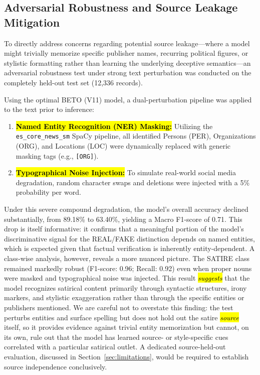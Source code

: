 \documentclass[informatics,article,accept,pdftex,moreauthors]{Definitions/mdpi}
\begin{document}
\subsection{Adversarial Robustness and Source Leakage Mitigation}
To directly address concerns regarding potential source leakage—where a model might trivially memorize specific publisher names, recurring political figures, or stylistic formatting rather than learning the underlying deceptive semantics—an adversarial robustness test under strong text perturbation was conducted on the completely held-out test set (12,336 records).

Using the optimal BETO (V11) model, a dual-perturbation pipeline was applied to the text prior to inference:
\begin{enumerate}
    \item \textbf{\hl{Named Entity Recognition (NER) Masking:}} Utilizing the \texttt{es\_core\_news\_sm} SpaCy pipeline, all identified Persons (PER), Organizations (ORG), and Locations (LOC) were dynamically replaced with generic masking tags (e.g., \texttt{[ORG]}).
    \item \textbf{\hl{Typographical Noise Injection:}} To simulate real-world social media degradation, random character swaps and deletions were injected with a 5\% probability per word.
\end{enumerate}

Under this severe compound degradation, the model's overall accuracy declined substantially, from 89.18\% to 63.40\%, yielding a Macro F1-score of 0.71. This drop is itself informative: it confirms that a meaningful portion of the model's discriminative signal for the REAL/FAKE distinction depends on named entities, which is expected given that factual verification is inherently entity-dependent. A class-wise analysis, however, reveals a more nuanced picture. The SATIRE class remained markedly robust (F1-score: 0.96; Recall: 0.92) even when proper nouns were masked and typographical noise was injected. This result \emph{\hl{suggests}} that the model recognizes satirical content primarily through syntactic structures, irony markers, and stylistic exaggeration rather than through the specific entities or publishers mentioned. We are careful not to overstate this finding: the test perturbs entities and surface spelling but does not hold out the satire \emph{\hl{source}} itself, so it provides evidence against trivial entity memorization but cannot, on its own, rule out that the model has learned source- or style-specific cues correlated with a particular satirical outlet. A dedicated source-held-out evaluation, discussed in Section~\ref{sec:limitations}, would be required to establish source independence conclusively.
\end{document}
